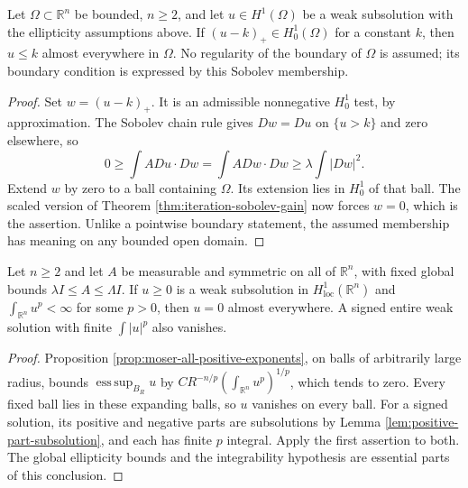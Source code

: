\begin{proposition}\label{prop:weak-maximum-sobolev-boundary}
Let $\Omega\subset\mathbb R^n$ be bounded, $n\geq2$, and let $u\in H^1(\Omega)$ be a weak subsolution with the ellipticity assumptions above. If $(u-k)_+\in H_0^1(\Omega)$ for a constant $k$, then $u\leq k$ almost everywhere in $\Omega$. No regularity of the boundary of $\Omega$ is assumed; its boundary condition is expressed by this Sobolev membership.
\end{proposition}
\begin{proof}
Set $w=(u-k)_+$. It is an admissible nonnegative $H_0^1$ test, by approximation. The Sobolev chain rule gives $Dw=Du$ on $\{u>k\}$ and zero elsewhere, so
\[
 0\geq\int A Du\cdot Dw=\int A Dw\cdot Dw\geq\lambda\int|Dw|^2.
\]
Extend $w$ by zero to a ball containing $\Omega$. Its extension lies in $H_0^1$ of that ball. The scaled version of Theorem \ref{thm:iteration-sobolev-gain} now forces $w=0$, which is the assertion. Unlike a pointwise boundary statement, the assumed membership has meaning on any bounded open domain.
\end{proof}

\begin{corollary}\label{cor:integrable-subsolution-liouville}
Let $n\geq2$ and let $A$ be measurable and symmetric on all of $\mathbb R^n$, with fixed global bounds $\lambda I\leq A\leq\Lambda I$. If $u\geq0$ is a weak subsolution in $H^1_{\mathrm{loc}}(\mathbb R^n)$ and $\int_{\mathbb R^n}u^p<\infty$ for some $p>0$, then $u=0$ almost everywhere. A signed entire weak solution with finite $\int|u|^p$ also vanishes.
\end{corollary}
\begin{proof}
Proposition \ref{prop:moser-all-positive-exponents}, on balls of arbitrarily large radius, bounds $\operatorname*{ess\,sup}_{B_R}u$ by $C R^{-n/p}(\int_{\mathbb R^n}u^p)^{1/p}$, which tends to zero. Every fixed ball lies in these expanding balls, so $u$ vanishes on every ball. For a signed solution, its positive and negative parts are subsolutions by Lemma \ref{lem:positive-part-subsolution}, and each has finite $p$ integral. Apply the first assertion to both. The global ellipticity bounds and the integrability hypothesis are essential parts of this conclusion.
\end{proof}
